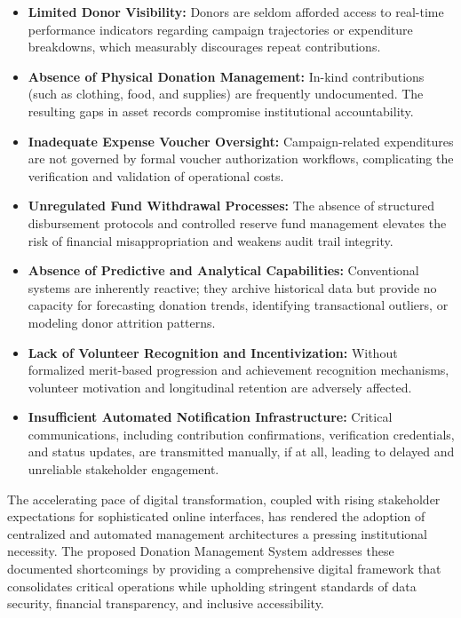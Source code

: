 \documentclass{thesis-library}
\begin{document}
\begin{itemize}
    \item \textbf{Limited Donor Visibility:} Donors are seldom afforded access to real-time performance indicators regarding campaign trajectories or expenditure breakdowns, which measurably discourages repeat contributions.
    \item \textbf{Absence of Physical Donation Management:} In-kind contributions (such as clothing, food, and supplies) are frequently undocumented. The resulting gaps in asset records compromise institutional accountability.
    \item \textbf{Inadequate Expense Voucher Oversight:} Campaign-related expenditures are not governed by formal voucher authorization workflows, complicating the verification and validation of operational costs.
    \item \textbf{Unregulated Fund Withdrawal Processes:} The absence of structured disbursement protocols and controlled reserve fund management elevates the risk of financial misappropriation and weakens audit trail integrity.
    \item \textbf{Absence of Predictive and Analytical Capabilities:} Conventional systems are inherently reactive; they archive historical data but provide no capacity for forecasting donation trends, identifying transactional outliers, or modeling donor attrition patterns.
    \item \textbf{Lack of Volunteer Recognition and Incentivization:} Without formalized merit-based progression and achievement recognition mechanisms, volunteer motivation and longitudinal retention are adversely affected.
    \item \textbf{Insufficient Automated Notification Infrastructure:} Critical communications, including contribution confirmations, verification credentials, and status updates, are transmitted manually, if at all, leading to delayed and unreliable stakeholder engagement.
\end{itemize}

The accelerating pace of digital transformation, coupled with rising stakeholder expectations for sophisticated online interfaces, has rendered the adoption of centralized and automated management architectures a pressing institutional necessity. The proposed Donation Management System addresses these documented shortcomings by providing a comprehensive digital framework that consolidates critical operations while upholding stringent standards of data security, financial transparency, and inclusive accessibility.
\end{document}
